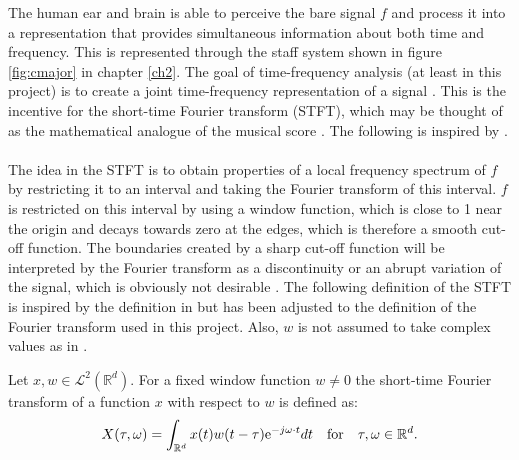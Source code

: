 The human ear and brain is able to perceive the bare signal $f$ and process it into a representation that provides simultaneous information about both time and frequency. This is represented through the staff system shown in figure \ref{fig:cmajor} in chapter \ref{ch2}. The goal of time-frequency analysis (at least in this project) is to create a joint time-frequency representation of a signal \cite{page 22, FTFA}. This is the incentive for the short-time Fourier transform (STFT), which may be thought of as the mathematical analogue of the musical score \cite{page 37, FTFA}. The following is inspired by \cite{page 37, FTFA}.
\\ \\
The idea in the STFT is to obtain properties of a local frequency spectrum of $f$ by restricting it to an interval and taking the Fourier transform of this interval. $f$ is restricted on this interval by using a window function, which is close to 1 near the origin and decays towards zero at the edges, which is therefore a smooth cut-off function. The boundaries created by a sharp cut-off function will be interpreted by the Fourier transform as a discontinuity or an abrupt variation of the signal, which is obviously not desirable \cite{Davis}. The following definition of the STFT is inspired by the definition in \cite{page 37, FTFA} but has been adjusted to the definition of the Fourier transform used in this project. Also, $w$ is not assumed to take complex values as in \cite{page 37, FTFA}.

\begin{definition}\label{def:stft}
Let $x,w \in \mathcal{L}^2(\mathbb{R}^d)$. For a fixed window function $w \neq 0$ the short-time Fourier transform of a function $x$ with respect to $w$ is defined as:
\begin{align}
X(\tau,\omega) = \int_{\mathbb{R}^d} x(t) w(t - \tau) \text{e}^{-j \omega \cdot t} dt \quad \textnormal{for} \quad \tau,\omega \in \mathbb{R}^d.
\end{align}
\end{definition}

